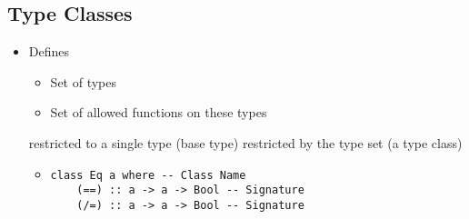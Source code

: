 \subsection{Type Classes}
\begin{itemize}
    \item Defines
        \begin{itemize}
            \item Set of types
            \item Set of allowed functions on these types
        \end{itemize}
     restricted to a single type (base type)
     restricted by the type set (a type class)
        \begin{itemize}
             upper-case (I guess)
             Function names with their type
                \begin{itemize}
                    \item Required to be implemented by instances of this type
                \end{itemize}
             Definition based on other signatures
                \begin{itemize}
                    \item Optional
                    \item Can be overwritten
                \end{itemize}
            \item 
\begin{verbatim}
class Eq a where -- Class Name
    (==) :: a -> a -> Bool -- Signature
    (/=) :: a -> a -> Bool -- Signature


\end{verbatim}
\end{itemize}
\end{itemize}
